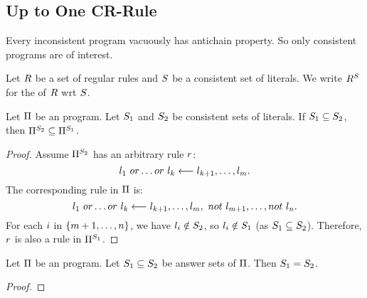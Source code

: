 \documentclass{paper}
\begin{document}
\begin{flushleft}
\begin{example}
\end{example}

\subsection{Up to One CR-Rule}

\begin{remark}
\label{vacuous_antichain}

Every inconsistent \cp{} program vacuously has
antichain property.
So only consistent programs are of interest.

\end{remark}

\begin{definition}
[Reduct]

Let $R$ be a set of regular rules and $S$ be a
consistent set of literals.
We write ${R}^{S}$ for the  of
$R$ wrt $S$.

\end{definition}

\begin{lemma}
\label{reducts_subset}

Let $\Pi$ be an \ap{} program.
Let ${S}_{1}$ and ${S}_{2}$ be consistent sets of
literals.
If ${S}_{1} \subseteq {S}_{2}$, then
${\Pi}^{{S}_{2}} \subseteq {\Pi}^{{S}_{1}}$.

\end{lemma}

\begin{proof}

Assume ${\Pi}^{{S}_{2}}$ has an arbitrary rule $r$:
$$l_1\ or \ldots or\ l_k \longleftarrow l_{k+1}, \ldots, l_m.$$
The corresponding rule in $\Pi$ is:
$$l_1\ or \ldots or\ l_k \longleftarrow l_{k+1}, \ldots, l_m,\ not\ {l_{m+1}}, \ldots, not\ {l_n}.$$
For each $i$ in $\{m + 1, \ldots, n\}$, we have
$l_i \notin {S}_{2}$,
so $l_i \notin {S}_{1}$ (as ${S}_{1} \subseteq {S}_{2}$).
Therefore, $r$ is also a rule in ${\Pi}^{{S}_{1}}$.

\end{proof}

\begin{theorem}
\label{antichain_a_prolog}

Let $\Pi$ be an \ap{} program.
Let ${S}_{1} \subseteq {S}_{2}$ be answer sets of $\Pi$.
Then ${S}_{1} = {S}_{2}$.

\end{theorem}

\begin{proof}


\end{proof}
\end{flushleft}
\end{document}
